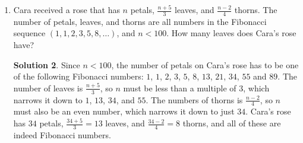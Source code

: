 \documentclass{article}
\theoremstyle{definition}
\newtheorem*{solution}{Solution}
\begin{document}
\begin{enumerate}
        \begin{solution}
            The lawn is mowed on days $1, 6, 11, 16, \dot, 191, 196, 201$. This
            is an arithmetic sequence and the common difference is $5$, since
            the lawn is mowed every $5$ days. To get from $1$ to $201$, the common
            difference will have been added $\frac{201 - 1}{5} = \frac{200}{5} =
            40$ times. This means day $201$ will be the $41$st mowing. For the
            first $40$ mowing days, the lawn will have been mowed $\frac{40}{4} =
            10$ times in each of the directions E-W, NE-SW, N-S, and NW-SE.
            Therefore, for the $41$st mowing, on Day $201$, the sequence of
            directions will begin again with a mowing in the direction on E-W or
            East-West.
        \end{solution}
        \item Cara received a rose that has $n$ petals, $\frac{n + 5}{3}$ leaves, and $\frac{n-2}{4}$ thorns. The number of petals, leaves, and thorns are all numbers in the Fibonacci sequence $(1, 1, 2, 3, 5, 8, \dots)$, and $n < 100$. How many leaves does Cara's rose have?
        \begin{solution}
            Since $n < 100$, the number of petals on Cara's rose has to be one of the following Fibonacci numbers: $1$, $1$, $2$, $3$, $5$, $8$, $13$, $21$, $34$, $55$ and $89$. The number of leaves is $\frac{n + 5}{3}$, so $n$ must be less than a multiple of $3$, which narrows it down to $1$, $13$, $34$, and $55$. The numbers of thorns is $\frac{n - 2}{4}$, so $n$ must also be an even number, which narrows it down to just $34$. Cara's rose has $34$ petals, $\frac{34 + 5}{3} = 13$ leaves, and $\frac{34 - 2}{4} = 8$ thorns, and all of these are indeed Fibonacci numbers.
        \end{solution}
    \end{enumerate}
\end{document}
